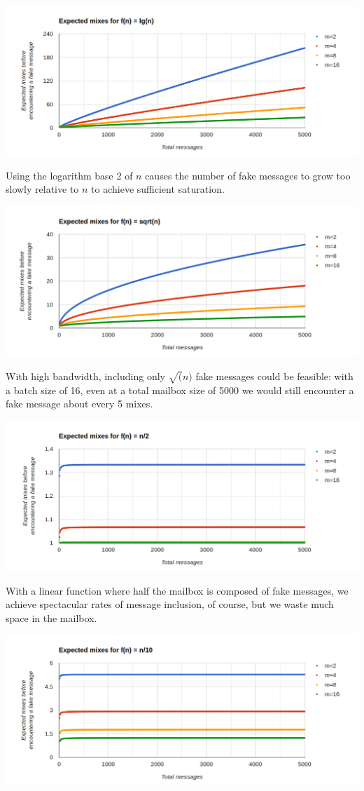 \documentclass[pageno]{jpaper}
\begin{document}
\includegraphics[width=\textwidth]{lgn}

Using the logarithm base 2 of $n$ causes the number of fake messages to grow too slowly relative to $n$ to achieve sufficient saturation.

\includegraphics[width=\textwidth]{sqrtn}

With high bandwidth, including only $\sqrt(n)$ fake messages could be feasible: with a batch size of 16, even at a total mailbox size of 5000 we would still encounter a fake message about every 5 mixes.


\includegraphics[width=\textwidth]{nover2}

With a linear function where half the mailbox is composed of fake messages, we achieve spectacular rates of message inclusion, of course, but we waste much space in the mailbox.

\includegraphics[width=\textwidth]{nover10}
\end{document}

